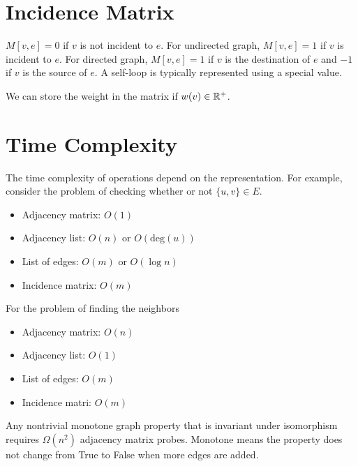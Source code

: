 \section{Incidence Matrix}

$M[v,e]=0$ if $v$ is not incident to $e$. For undirected graph, $M[v,e]=1$ if $v$ is incident to $e$. For directed graph, $M[v,e]=1$ if $v$ is the destination of $e$ and $-1$ if $v$ is the source of $e$. A self-loop is typically represented using a special value.

We can store the weight in the matrix if $w(v) \in \mathbb{R}^+$. 

\section{Time Complexity}

The time complexity of operations depend on the representation. For example, consider the problem of checking whether or not $\{u,v\} \in E$.

\begin{itemize}
    \item Adjacency matrix: $O(1)$
    \item Adjacency list: $O(n)$ or $O(\mathrm{deg}(u))$
    \item List of edges: $O(m)$ or $O(\log n)$
    \item Incidence matrix: $O(m)$  
\end{itemize}

For the problem of finding the neighbors

\begin{itemize}
    \item Adjacency matrix: $O(n)$ 
    \item Adjacency list: $O(1)$ 
    \item List of edges: $O(m)$ 
    \item Incidence matri: $O(m)$ 
\end{itemize}


\begin{theorem}
    Any nontrivial monotone graph property that is invariant under isomorphism requires $\Omega(n^2)$ adjacency matrix probes. Monotone means the property does not change from True to False when more edges are added.
\end{theorem}